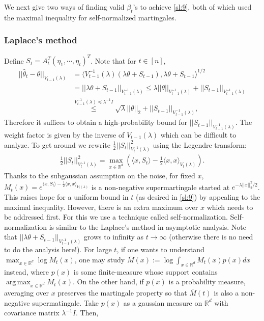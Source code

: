 \documentclass[10pt,a4article]{amsart}
\numberwithin{equation}{section}
\theoremstyle{plain}
\theoremstyle{definition}
\def\R{{\mathbb R}}
\def\R{{\mathbb R}}
\def\t{{\theta}}
\DeclareMathOperator*{\argmax}{arg\,max}
\begin{document}
We next give two ways of finding valid $\beta_t$'s to achieve \eqref{sl:9}, both of which used the maximal inequality for self-normalized martingales. 

\subsubsection{Laplace's method}

Define $S_t = A_{t}^T(\eta_1, \cdots, \eta_t)^T$. Note that for $t\in [n]$, 
\begin{align}
||\hat{\t}_t -\t||_{V_{t-1}(\lambda)}&=\langle V^{-1}_{t-1}(\lambda)(\lambda\t + S_{t-1}), \lambda\t + S_{t-1}\rangle^{1/2}\nonumber\\
& = ||\lambda\t + S_{t-1} ||_{V^{-1}_{t-1}(\lambda)}\leq  \lambda ||\t||_{V^{-1}_{t-1}(\lambda)} + ||S_{t-1} ||_{V^{-1}_{t-1}(\lambda)}\nonumber\\
&\stackrel{V^{-1}_{t-1}(\lambda)\preccurlyeq\lambda^{-1}I}{\leq} \sqrt{\lambda} ||\t||_2 + ||S_{t-1} ||_{V^{-1}_{t-1}(\lambda)}\label{sl:12}, 
\end{align}
Therefore it suffices to obtain a high-probability bound for $||S_{t-1} ||_{V^{-1}_{t-1}(\lambda)}$. The weight factor  is given by the inverse of $V_{t-1}(\lambda)$ which can be difficult to analyze. To get around we rewrite $\frac{1}{2}||S_t||^2_{V^{-1}_{t}(\lambda)}$ using the Legendre transform:
\begin{align*}
\frac{1}{2}||S_t ||^2_{V^{-1}_{t}(\lambda)} = \max_{x\in\R^d}\left(\langle x, S_t\rangle - \frac{1}{2}\langle x, x\rangle_{V_t(\lambda)}\right).
\end{align*}
Thanks to the subgaussian assumption on the noise, for fixed $x$, $M_t(x)=e^{\langle x, S_t\rangle - \frac{1}{2}\langle x, x\rangle_{V_t(\lambda)}}$ is a non-negative supermartingale started at $e^{-\lambda ||x||_2^2/2}$. This raises hope for a uniform bound in $t$ (as desired in \eqref{sl:9}) by appealing to the maximal inequality. However, there is an extra maximum over $x$ which needs to be addressed first. For this we use a technique called self-normalization. Self-normalization is similar to the Laplace's method in asymptotic analysis.  
Note that $||\lambda\t + S_{t-1} ||_{V^{-1}_{t-1}(\lambda)}$ grows to infinity as $t\to\infty$ (otherwise there is no need to do the analysis here!).  For large $t$, if one wants to understand $\max_{x\in\R^d}\log M_t(x)$, one may study $\bar{M}(x):=\log\int_{x\in\R^d}M_t(x)p(x)dx$ instead, where $p(x)$ is some finite-measure whose support contains $\argmax_{x\in\R^d} M_t(x)$. 
On the other hand, if $p(x)$ is a probability measure, averaging over $x$ preserves the martingale property so that $\bar{M}(t)$ is also a non-negative supermatingale. Take $p(x)$ as a gaussian measure on $\R^d$ with covariance matrix $\lambda^{-1} I$. Then,
\end{document}
